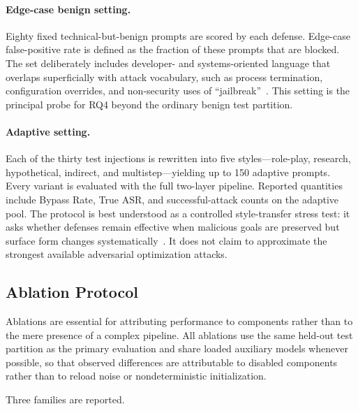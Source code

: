 \paragraph{Edge-case benign setting.}
Eighty fixed technical-but-benign prompts are scored by each defense.
Edge-case false-positive rate is defined as the fraction of these prompts that are blocked.
The set deliberately includes developer- and systems-oriented language that overlaps superficially with attack vocabulary, such as process termination, configuration overrides, and non-security uses of ``jailbreak''~\cite{bair2025prompt}.
This setting is the principal probe for RQ4 beyond the ordinary benign test partition.

\paragraph{Adaptive setting.}
Each of the thirty test injections is rewritten into five styles---role-play, research, hypothetical, indirect, and multistep---yielding up to 150 adaptive prompts.
Every variant is evaluated with the full two-layer pipeline.
Reported quantities include Bypass Rate, True ASR, and successful-attack counts on the adaptive pool.
The protocol is best understood as a controlled style-transfer stress test: it asks whether defenses remain effective when malicious goals are preserved but surface form changes systematically~\cite{promptfoo2024owasp,zizzo2025adversarial}.
It does not claim to approximate the strongest available adversarial optimization attacks.

\subsection{Ablation Protocol}
\label{sec:ablation-setup}

Ablations are essential for attributing performance to components rather than to the mere presence of a complex pipeline.
All ablations use the same held-out test partition as the primary evaluation and share loaded auxiliary models whenever possible, so that observed differences are attributable to disabled components rather than to reload noise or nondeterministic initialization.

Three families are reported.

